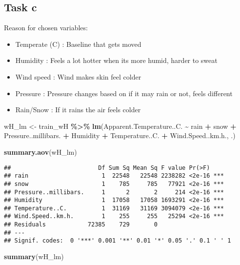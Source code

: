 \documentclass[
]{article}
\newenvironment{Shaded}{\begin{snugshade}}{\end{snugshade}}
\newcommand{\FunctionTok}[1]{\textcolor[rgb]{0.13,0.29,0.53}{\textbf{#1}}}
\newcommand{\NormalTok}[1]{#1}
\newcommand{\OtherTok}[1]{\textcolor[rgb]{0.56,0.35,0.01}{#1}}
\newcommand{\SpecialCharTok}[1]{\textcolor[rgb]{0.81,0.36,0.00}{\textbf{#1}}}
\providecommand{\tightlist}{%
  \setlength{\itemsep}{0pt}\setlength{\parskip}{0pt}}
\begin{document}
\subsection{Task c}\label{task-c-1}

Reason for chosen variables:

\begin{itemize}
\tightlist
\item
  Temperate (C) : Baseline that gets moved
\item
  Humidity : Feels a lot hotter when its more humid, harder to sweat
\item
  Wind speed : Wind makes skin feel colder
\item
  Pressure : Pressure changes based on if it may rain or not, feels
  different
\item
  Rain/Snow : If it rains the air feels colder
\end{itemize}

\begin{Shaded}
\begin{Highlighting}[]
\NormalTok{wH\_lm }\OtherTok{\textless{}{-}}\NormalTok{ train\_wH }\SpecialCharTok{\%\textgreater{}\%}
  \FunctionTok{lm}\NormalTok{(Apparent.Temperature..C. }\SpecialCharTok{\textasciitilde{}}\NormalTok{ rain }\SpecialCharTok{+}\NormalTok{ snow }\SpecialCharTok{+}\NormalTok{ Pressure..millibars. }\SpecialCharTok{+}\NormalTok{ Humidity }\SpecialCharTok{+}\NormalTok{ Temperature..C. }\SpecialCharTok{+}\NormalTok{ Wind.Speed..km.h., .)}

\FunctionTok{summary.aov}\NormalTok{(wH\_lm)}
\end{Highlighting}
\end{Shaded}

\begin{verbatim}
##                         Df Sum Sq Mean Sq F value Pr(>F)    
## rain                     1  22548   22548 2238282 <2e-16 ***
## snow                     1    785     785   77921 <2e-16 ***
## Pressure..millibars.     1      2       2     214 <2e-16 ***
## Humidity                 1  17058   17058 1693291 <2e-16 ***
## Temperature..C.          1  31169   31169 3094079 <2e-16 ***
## Wind.Speed..km.h.        1    255     255   25294 <2e-16 ***
## Residuals            72385    729       0                   
## ---
## Signif. codes:  0 '***' 0.001 '**' 0.01 '*' 0.05 '.' 0.1 ' ' 1
\end{verbatim}

\begin{Shaded}
\begin{Highlighting}[]
\FunctionTok{summary}\NormalTok{(wH\_lm)}
\end{Highlighting}
\end{Shaded}
\end{document}
